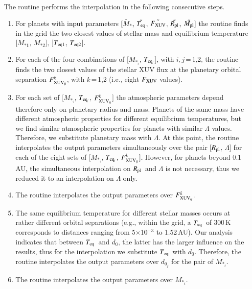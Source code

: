 \documentclass{aa}
\def\Teq{$T_{\rm eq}$}
\def\Rpl{$R_{\rm pl}$}
\begin{document}
{The routine performs the interpolation in the following
consecutive steps.}
\begin{enumerate}
\item {For planets with input parameters [$\tilde{M_*}$,
$\tilde{T_{\rm eq}}$, $\tilde{F_{\rm XUV}}$, $\tilde{R_{\rm pl}}$,
$\tilde{M_{\rm pl}}$] the routine finds in the grid the two
closest values of stellar mass and equilibrium temperature
[$M_{*1}$, $M_{*2}$], [$T_{\rm eq1}$, $T_{\rm eq2}$].}

\item {For each of the four combinations of [$M_{*_i}$, $T_{\rm
eq_{\it j}}$], with $i,j$\,=\,1,2, the routine finds the two
closest values of the stellar XUV flux at the planetary orbital
separation $F_{\rm XUV_{\it ij}}^{k}$, with $k$\,=\,1,2 (i.e.,
eight $F_{\rm XUV}$ values).}

\item {For each set of [$M_{*_i}$, $T_{\rm eq_{\it j}}$, $F_{\rm
XUV_{\it ij}}^{k}$] the atmospheric parameters depend therefore
only on planetary radius and mass. Planets of the same mass have
different atmospheric properties for different equilibrium
temperatures, but we find similar atmospheric properties for
planets with similar $\Lambda$ values. Therefore, we substitute
planetary mass with $\Lambda$. At this point, the routine
interpolates the output parameters simultaneously over the pair
[\Rpl, $\Lambda$] for each of the eight sets of [$M_{*_i}$,
$T_{\rm eq_{\it j}}$, $F_{\rm XUV_{\it ij}}^{k}$]. However, for
planets beyond 0.1\,AU, the simultaneous interpolation on \Rpl\
and $\Lambda$ is not necessary, thus we reduced it to an
interpolation on $\Lambda$ only.}

\item {The routine interpolates the output parameters over $F_{\rm
XUV_{\it ij}}^{k}$.}

\item {The same equilibrium temperature for different stellar
masses occurs at rather different orbital separations (e.g.,
within the grid, a \Teq\ of $300$\,K corresponds to distances
ranging from 5$\times$10$^{-3}$ to 1.52\,AU). Our analysis
\citep[see Section~\ref{sec:discussion} and
also][]{kubyshkina2018} indicates that between \Teq\ and $d_0$,
the latter has the larger influence on the results, thus for the
interpolation we substitute \Teq\ with $d_0$. Therefore, the
routine interpolates the output parameters over $d_{0_j}$ for the
pair of $M_{*_i}$.}

\item {The routine interpolates the output parameters over
$M_{*_i}$.}
\end{enumerate}
\end{document}
